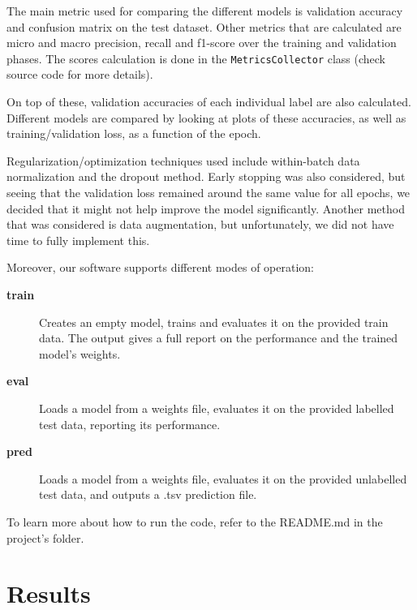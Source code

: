 \documentclass[a4paper, 12pt]{article}
\begin{document}
The main metric used for comparing the different models is validation accuracy and confusion matrix on the test dataset. Other metrics that are calculated are micro and macro precision, recall and f1-score over the training and validation phases. The scores calculation is done in the \texttt{MetricsCollector} class (check source code for more details).

On top of these, validation accuracies of each individual label are also calculated. Different models are compared by looking at plots of these accuracies, as well as training/validation loss, as a function of the epoch.

Regularization/optimization techniques used include within-batch data normalization and the dropout method. Early stopping was also considered, but seeing that the validation loss remained around the same value for all epochs, we decided that it might not help improve the model significantly. Another method that was considered is data augmentation, but unfortunately, we did not have time to fully implement this. %

Moreover, our software supports different modes of operation:
\begin{description}
  \item[\textbf{train}] Creates an empty model, trains and evaluates it on the provided train data. The output gives a full report on the performance and the trained model's weights.
  \item[\textbf{eval}] Loads a model from a weights file, evaluates it on the provided labelled test data, reporting its performance.
  \item[\textbf{pred}] Loads a model from a weights file, evaluates it on the provided unlabelled test data, and outputs a .tsv prediction file. 
\end{description}

To learn more about how to run the code, refer to the README.md in the project's folder.

\section{Results}
\end{document}
